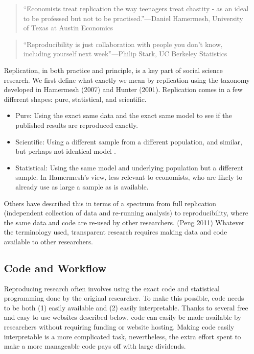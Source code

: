 \documentclass[12pt] {article}
\begin{document}
\begin{quote}
``Economists treat replication the way teenagers treat chastity - as an
ideal to be professed but not to be practised.''---Daniel Hamermesh,
University of Texas at Austin Economics
\end{quote}

\begin{quote}
``Reproducibility is just collaboration with people you don't know,
including yourself next week''---Philip Stark, UC Berkeley Statistics
\end{quote}

Replication, in both practice and principle, is a key part of social
science research. We first define what exactly we mean by replication
using the taxonomy developed in Hamermesh (2007) and Hunter (2001).
Replication comes in a few different shapes: pure, statistical, and
scientific.

\begin{itemize}
\item
  Pure: Using the exact same data and the exact same model to see if the
  published results are reproduced exactly.
\item
  Scientific: Using a different sample from a different population, and
  similar, but perhaps not identical model .
\item
  Statistical: Using the same model and underlying population but a
  different sample. In Hamermesh's view, less relevant to economists,
  who are likely to already use as large a sample as is available.
\end{itemize}

Others have described this in terms of a spectrum from full replication
(independent collection of data and re-running analysis) to
reproducibility, where the same data and code are re-used by other
researchers. (Peng 2011) Whatever the terminology used, transparent
research requires making data and code available to other researchers.

\subsection{Code and Workflow}\label{code-and-workflow}

Reproducing research often involves using the exact code and statistical
programming done by the original researcher. To make this possible, code
needs to be both (1) easily available and (2) easily interpretable.
Thanks to several free and easy to use websites described below, code
can easily be made available by researchers without requiring funding or
website hosting. Making code easily interpretable is a more complicated
task, nevertheless, the extra effort spent to make a more manageable
code pays off with large dividends.
\end{document}
